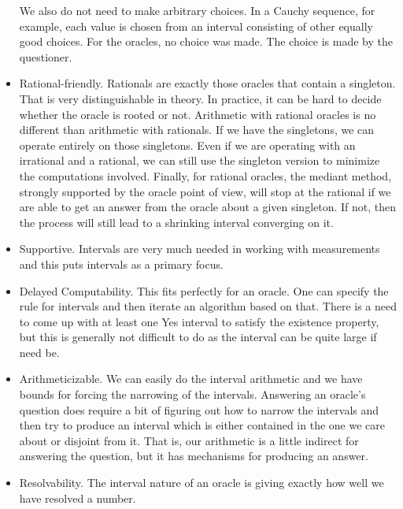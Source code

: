 \documentclass[12pt]{article}
\begin{document}
\begin{itemize}
    We also do not need to make arbitrary choices. In a Cauchy sequence, for example, each value is chosen from an interval consisting of other equally good choices. For the oracles, no choice was made. The choice is made by the questioner. 
    \item Rational-friendly. Rationals are exactly those oracles that contain a singleton. That is very distinguishable in theory. In practice, it can be hard to decide whether the oracle is rooted or not. Arithmetic with rational oracles is no different than arithmetic with rationals. If we have the singletons, we can operate entirely on those singletons. Even if we are operating with an irrational and a rational, we can still use the singleton version to minimize the computations involved. Finally, for rational oracles, the mediant method, strongly supported by the oracle point of view, will stop at the rational if we are able to get an answer from the oracle about a given singleton. If not, then the process will still lead to a shrinking interval converging on it.
    \item Supportive. Intervals are very much needed in working with measurements and this puts intervals as a primary focus. 
    \item Delayed Computability. This fits perfectly for an oracle. One can specify the rule for intervals and then iterate an algorithm based on that. There is a need to come up with at least one Yes interval to satisfy the existence property, but this is generally not difficult to do as the interval can be quite large if need be. 
    \item Arithmeticizable. We can easily do the interval arithmetic and we have bounds for forcing the narrowing of the intervals. Answering an oracle's question does require a bit of figuring out how to narrow the intervals and then try to produce an interval which is either contained in the one we care about or disjoint from it. That is, our arithmetic is a little indirect for answering the question, but it has mechanisms for producing an answer. 
    \item Resolvability. The interval nature of an oracle is giving exactly how well we have resolved a number. 
\end{itemize}
\end{document}
